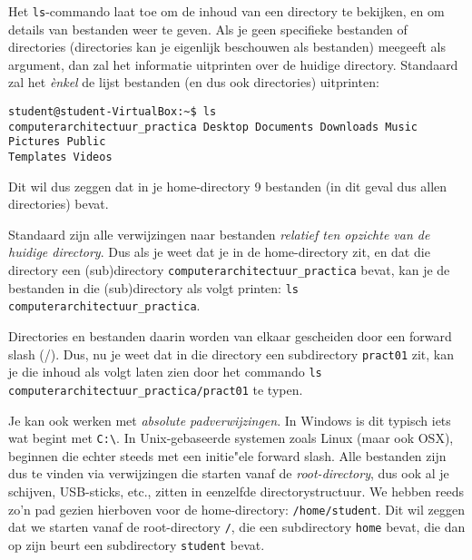 \documentclass[a4paper,twoside,openany]{memoir}
\begin{document}
Het \verb!ls!-commando laat toe om de inhoud van een directory te bekijken, en om details van bestanden weer te geven. Als je geen specifieke bestanden of directories (directories kan je eigenlijk beschouwen als bestanden) meegeeft als argument, dan zal het informatie uitprinten over de huidige directory. Standaard zal het \emph{\`enkel} de lijst bestanden (en dus ook directories) uitprinten:

\begin{verbatim}
student@student-VirtualBox:~$ ls
computerarchitectuur_practica Desktop Documents Downloads Music Pictures Public
Templates Videos
\end{verbatim}

Dit wil dus zeggen dat in je home-directory 9 bestanden (in dit geval dus allen directories) bevat.

Standaard zijn alle verwijzingen naar bestanden \emph{relatief ten opzichte van de huidige directory}. Dus als je weet dat je in de home-directory zit, en dat die directory een (sub)directory \verb!computerarchitectuur_practica! bevat, kan je de bestanden in die (sub)directory als volgt printen: \verb!ls computerarchitectuur_practica!.

Directories en bestanden daarin worden van elkaar gescheiden door een forward slash (/). Dus, nu je weet dat in die directory een subdirectory \verb!pract01! zit, kan je die inhoud als volgt laten zien door het commando  \verb!ls computerarchitectuur_practica/pract01! te typen.

Je kan ook werken met \emph{absolute padverwijzingen}. In Windows is dit typisch iets wat begint met \verb!C:\!. In Unix-gebaseerde systemen zoals Linux (maar ook OSX), beginnen die echter steeds met een initie"ele forward slash. Alle bestanden zijn dus te vinden via verwijzingen die starten vanaf de \emph{root-directory}, dus ook al je schijven, USB-sticks, etc., zitten in eenzelfde directorystructuur. We hebben reeds zo'n pad gezien hierboven voor de home-directory: \verb!/home/student!. Dit wil zeggen dat we starten vanaf de root-directory \verb!/!, die een subdirectory \verb!home! bevat, die dan op zijn beurt een subdirectory \verb!student! bevat.
\end{document}
